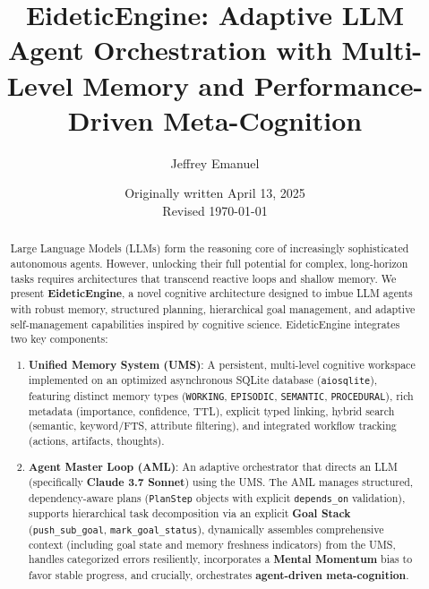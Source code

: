 \documentclass[12pt,a4paper]{article}
\title{\LARGE \bf EideticEngine: Adaptive LLM Agent Orchestration with Multi-Level Memory and Performance-Driven Meta-Cognition}
\author{Jeffrey Emanuel}
\date{Originally written April 13, 2025 \\ Revised \today}
\newcommand{\code}[1]{\nolinkurl{#1}}
\begin{document}

\maketitle
\vspace{2\baselineskip} %

\begin{abstract}
Large Language Models (LLMs) form the reasoning core of increasingly sophisticated autonomous agents. However, unlocking their full potential for complex, long-horizon tasks requires architectures that transcend reactive loops and shallow memory. We present \textbf{EideticEngine}, a novel cognitive architecture designed to imbue LLM agents with robust memory, structured planning, hierarchical goal management, and adaptive self-management capabilities inspired by cognitive science.
\onehalfspacing
EideticEngine integrates two key components:
\onehalfspacing
\begin{enumerate}
    \item \textbf{Unified Memory System (UMS)}: A persistent, multi-level cognitive workspace implemented on an optimized asynchronous SQLite database (\code{aiosqlite}), featuring distinct memory types (\code{WORKING}, \code{EPISODIC}, \code{SEMANTIC}, \code{PROCEDURAL}), rich metadata (importance, confidence, TTL), explicit typed linking, hybrid search (semantic, keyword/FTS, attribute filtering), and integrated workflow tracking (actions, artifacts, thoughts).
    \item \textbf{Agent Master Loop (AML)}: An adaptive orchestrator that directs an LLM (specifically \textbf{Claude 3.7 Sonnet}) using the UMS. The AML manages structured, dependency-aware plans (\code{PlanStep} objects with explicit \code{depends\_on} validation), supports hierarchical task decomposition via an explicit \textbf{Goal Stack} (\code{push\_sub\_goal}, \code{mark\_goal\_status}), dynamically assembles comprehensive context (including goal state and memory freshness indicators) from the UMS, handles categorized errors resiliently, incorporates a \textbf{Mental Momentum} bias to favor stable progress, and crucially, orchestrates \textbf{agent-driven meta-cognition}.
\end{enumerate} %


\end{abstract}
\end{document}
